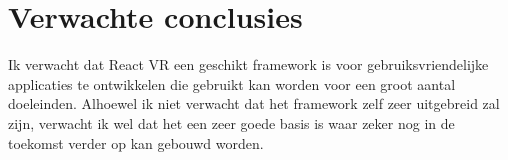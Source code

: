 \documentclass[fleqn,10pt]{voorstel}
\begin{document}
\section{Verwachte conclusies}
\label{sec:verwachte_conclusies}

Ik verwacht dat React VR een geschikt framework is voor gebruiksvriendelijke applicaties te ontwikkelen die gebruikt kan worden voor een groot aantal doeleinden. Alhoewel ik niet verwacht dat het framework zelf zeer uitgebreid zal zijn, verwacht ik wel dat het een zeer goede basis is waar zeker nog in de toekomst verder op kan gebouwd worden.

\printbibliography[heading=bibintoc]
\end{document}
